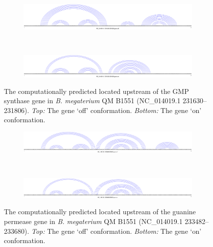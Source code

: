 \begin{figure}[!ht]
\centering
\begin{subfigure}[h]{\textwidth}
\centering
\includegraphics[width=.9\textwidth]{Figures/Ribofinder/NC_014019_1_231630_231806_OFF.pdf}
\end{subfigure} \\
\medskip
\begin{subfigure}[h]{\textwidth}
\centering
\includegraphics[width=.9\textwidth]{Figures/Ribofinder/NC_014019_1_231630_231806_ON.pdf}
\end{subfigure}
\caption[Structures for the putative \rb located upstream of the GMP synthase gene in {\em B. megaterium} QM B1551]{The computationally predicted \rb located upstream of the GMP synthase
gene in {\em B. megaterium} QM B1551 (NC\_014019.1 231630--231806).
{\em Top:} The gene `off' conformation. {\em Bottom:} The gene `on' conformation.}
\label{fig:figure:NC_014019_1_231630_231806}
\end{figure}
\medskip

\begin{figure}[!ht]
\centering
\begin{subfigure}[h]{\textwidth}
\centering
\includegraphics[width=.9\textwidth]{Figures/Ribofinder/NC_014019_1_233482_233680_OFF.pdf}
\end{subfigure} \\
\medskip
\begin{subfigure}[h]{\textwidth}
\centering
\includegraphics[width=.9\textwidth]{Figures/Ribofinder/NC_014019_1_233482_233680_ON.pdf}
\end{subfigure}
\caption[Structures for the putative \rb located upstream of the guanine permease gene in {\em B. megaterium} QM B1551]{The computationally predicted \rb located upstream of the guanine permease
gene in {\em B. megaterium} QM B1551 (NC\_014019.1 233482--233680).
{\em Top:} The gene `off' conformation. {\em Bottom:} The gene `on' conformation.}
\label{fig:figure:NC_014019_1_233482_233680}
\end{figure}
\medskip

